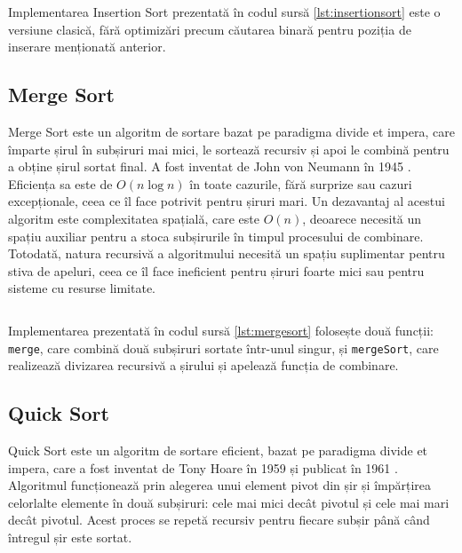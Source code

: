 \documentclass[9pt,a4paper,twocolumn,twoside]{rho-class/rho}
\begin{document}
\begin{code}
    \inputminted[style=friendly]{cpp}{cod_sursa/insertionsort.cpp}
    \caption{Implementarea Insertion Sort în C++.}
    \label{lst:insertionsort}
\end{code}



Implementarea Insertion Sort prezentată în codul sursă \ref{lst:insertionsort} este o versiune clasică, fără optimizări precum căutarea binară pentru poziția de inserare menționată anterior.

\subsection{Merge Sort}

Merge Sort este un algoritm de sortare bazat pe paradigma divide et impera, care împarte șirul în subșiruri mai mici, le sortează recursiv și apoi le combină pentru a obține șirul sortat final. A fost inventat de John von Neumann în 1945 \cite{knuth1998sorting}.
Eficiența sa este de $O(n \log n)$ în toate cazurile, fără surprize sau cazuri excepționale, ceea ce îl face potrivit pentru șiruri mari. 
\newline Un dezavantaj al acestui algoritm este complexitatea spațială, care este $O(n)$, deoarece necesită un spațiu auxiliar pentru a stoca subșirurile în timpul procesului de combinare. Totodată, natura recursivă a algoritmului necesită un spațiu suplimentar pentru stiva de apeluri, ceea ce îl face ineficient pentru șiruri foarte mici sau pentru sisteme cu resurse limitate.

\begin{code}
    \inputminted[style=friendly]{cpp}{cod_sursa/mergesort.cpp}
    \caption{Implementarea Merge Sort în C++.}
    \label{lst:mergesort}
\end{code}

Implementarea prezentată în codul sursă \ref{lst:mergesort} folosește două funcții: \texttt{merge}, care combină două subșiruri sortate într-unul singur, și \texttt{mergeSort}, care realizează divizarea recursivă a șirului și apelează funcția de combinare.


\subsection{Quick Sort}

Quick Sort este un algoritm de sortare eficient, bazat pe paradigma divide et impera, care a fost inventat de Tony Hoare în 1959 și publicat în 1961 \cite{hoare1961quicksort}. Algoritmul funcționează prin alegerea unui element pivot din șir și împărțirea celorlalte elemente în două subșiruri: cele mai mici decât pivotul și cele mai mari decât pivotul. Acest proces se repetă recursiv pentru fiecare subșir până când întregul șir este sortat.
\end{document}

